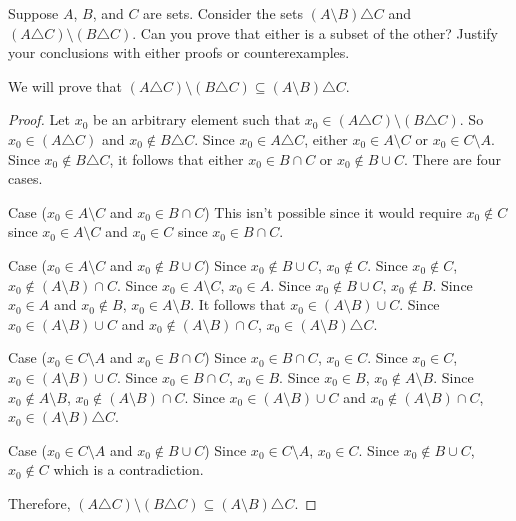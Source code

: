 \begin{tcolorbox}[title=Problem 26, breakable]
    Suppose $A$, $B$, and $C$ are sets. Consider the sets $(A \setminus B) \triangle C$ and 
    $(A \triangle C) \setminus (B \triangle C)$. Can you prove that either is a subset of the other?
    Justify your conclusions with either proofs or counterexamples.
\end{tcolorbox}

We will prove that $(A \triangle C) \setminus (B \triangle C) \subseteq (A
    \setminus B) \triangle C$.
\begin{proof}
    Let $x_0$ be an arbitrary element such that $x_0 \in (A \triangle C) \setminus (B \triangle C)$.
    So $x_0 \in (A \triangle C)$ and $x_0 \not \in B \triangle C$.
    Since $x_0 \in A \triangle C$, either $x_0 \in A \setminus C$ or $x_0 \in C \setminus A$.
    Since $x_0 \notin B \triangle C$, it follows that either $x_0 \in B \cap C$ or $x_0 \notin B \cup C$. There
    are four cases.

    Case ($x_0 \in A \setminus C$ and $x_0 \in B \cap C$) This isn't possible since
    it would require $x_0 \not \in C$ since $x_0 \in A \setminus C$ and $x_0 \in C$
    since $x_0 \in B \cap C$.

    Case ($x_0 \in A \setminus C$ and $x_0 \notin B \cup C$) Since $x_0 \not\in B
        \cup C$, $x_0 \not\in C$. Since $x_0 \not\in C$, $x_0 \notin (A \setminus B)
        \cap C$. Since $x_0 \in A \setminus C$, $x_0 \in A$. Since $x_0 \not \in B \cup
        C$, $x_0 \not \in B$. Since $x_0 \in A$ and $x_0 \not\in B$, $x_0 \in A
        \setminus B$. It follows that $x_0 \in (A \setminus B) \cup C$. Since $x_0 \in
        (A \setminus B) \cup C$ and $x_0 \not \in (A \setminus B) \cap C$, $x_0 \in (A
        \setminus B) \triangle C$.

    Case ($x_0 \in C \setminus A$ and $x_0 \in B \cap C$) Since $x_0 \in B \cap C$,
    $x_0 \in C$. Since $x_0 \in C$, $x_0 \in (A \setminus B) \cup C$. Since $x_0
        \in B \cap C$, $x_0 \in B$. Since $x_0 \in B$, $x_0 \not \in A \setminus B$.
    Since $x_0 \not \in A \setminus B$, $x_0 \not \in (A \setminus B) \cap C$.
    Since $x_0 \in (A \setminus B) \cup C$ and $x_0 \not \in (A \setminus B) \cap
        C$, $x_0 \in (A \setminus B) \triangle C$.

    Case ($x_0 \in C \setminus A$ and $x_0 \notin B \cup C$) Since $x_0 \in C
        \setminus A$, $x_0 \in C$. Since $x_0 \not\in B \cup C$, $x_0 \not \in C$ which
    is a contradiction.

    Therefore, $(A \triangle C) \setminus (B \triangle C) \subseteq (A \setminus B)
        \triangle C$.
\end{proof}

